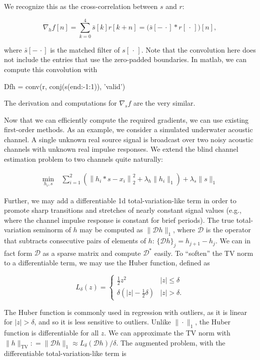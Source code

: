 \documentclass[journal]{IEEEtran}
\newcommand{\defeq}{\mathrel{\mathop:}=}
\begin{document}
\noindent We recognize this as the cross-correlation between $s$ and $r$:

\[ \nabla_h f[n] = \sum_{k=0}^4 \bar{s}[k]r[k+n] = \big(\bar{s}[{-\,\cdot}]\ast r[\,\cdot\,]\big)[n], \]

\noindent where $\bar{s}[{-\,\cdot}]$ is the matched filter of $s[\,\cdot\,]$.  Note that the convolution here does not include the entries that use the zero-padded boundaries.  In {\sc matlab}, we can compute this convolution with

\begin{verb}
  Dfh = conv(r, conj(s(end:-1:1)), 'valid')
\end{verb}

\noindent The derivation and computations for $\nabla_sf$ are the very similar.

Now that we can efficiently compute the required gradients, we can use existing first-order methods.  As an example, we consider a simulated underwater acoustic channel.  A single unknown real source signal is broadcast over two noisy acoustic channels with unknown real impulse responses.  We extend the blind channel estimation problem to two channels quite naturally:

\begin{align*}
   \min_{h_i,s} ~&\sum_{i=1}^2\left(\left\|h_i\ast s - x_i\right\|_2^2 + \lambda_{h}\|h_i\|_1\right) + \lambda_s\|s\|_1
\end{align*}

\noindent Further, we may add a differentiable 1d total-variation-like term in order to promote sharp transitions and stretches of nearly constant signal values (e.g., where the channel impulse response is constant for brief periods).  The true total-variation seminorm of $h$ may be computed as $\|\mathcal{D}h\|_1$, where $\mathcal{D}$ is the operator that subtracts consecutive pairs of elements of $h$: $\{\mathcal{D}h\}_j = h_{j+1} - h_j$.  We can in fact form $\mathcal{D}$ as a sparse matrix and compute $\mathcal{D}^\ast$ easily.  To ``soften'' the TV norm to a differentiable term, we may use the Huber function, defined as

\[ L_\delta(z) = \left\{\begin{array}{ll} \frac{1}{2}z^2 & |z| \le \delta\\ \delta\left(|z| - \frac{1}{2}\delta\right) & |z| > \delta. \end{array}\right. \] 

\noindent The Huber function is commonly used in regression with outliers, as it is linear for $|z|>\delta$, and so it is less sensitive to outliers.  Unlike ${\|\cdot\|_1}$, the Huber function is differentiable for all $z$.  We can approximate the TV norm with ${\|h\|_\text{TV} \defeq\|\mathcal{D}h\|_1 \approx L_\delta(\mathcal{D}h)/\delta}$.  The augmented problem, with the differentiable total-variation-like term is
\end{document}
